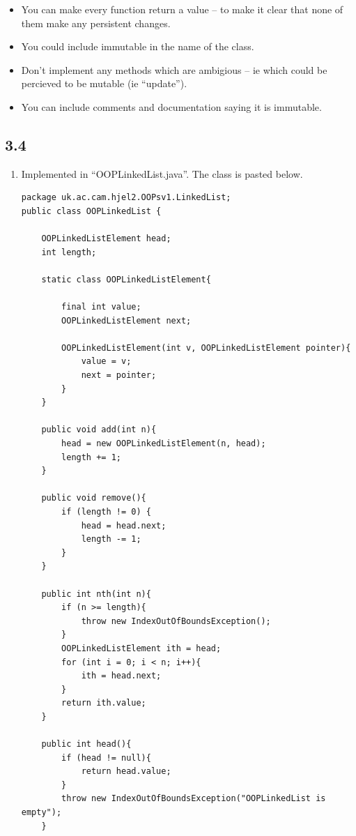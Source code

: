 \documentclass[10pt,\jkfside,a4paper]{article}
\begin{document}
\begin{enumerate}
\begin{enumerate}[label=(\alph*)]
\begin{itemize}
\item You can make every function return a value -- to make it clear that none 
of them make any persistent changes.
\item You could include immutable in the name of the class.
\item Don't implement any methods which are ambigious -- ie which could be percieved 
to be mutable (ie ``update'').
\item You can include comments and documentation saying it is immutable.
\end{itemize}

\end{enumerate}

\subsection*{3.4}
\begin{enumerate}[label=(\alph*)]
\item Implemented in ``OOPLinkedList.java''. The class is pasted below.

\begin{verbatim}
package uk.ac.cam.hjel2.OOPsv1.LinkedList;
public class OOPLinkedList {

    OOPLinkedListElement head;
    int length;

    static class OOPLinkedListElement{

        final int value;
        OOPLinkedListElement next;

        OOPLinkedListElement(int v, OOPLinkedListElement pointer){
            value = v;
            next = pointer;
        }
    }

    public void add(int n){
        head = new OOPLinkedListElement(n, head);
        length += 1;
    }

    public void remove(){
        if (length != 0) {
            head = head.next;
            length -= 1;
        }
    }

    public int nth(int n){
        if (n >= length){
            throw new IndexOutOfBoundsException();
        }
        OOPLinkedListElement ith = head;
        for (int i = 0; i < n; i++){
            ith = head.next;
        }
        return ith.value;
    }

    public int head(){
        if (head != null){
            return head.value;
        }
        throw new IndexOutOfBoundsException("OOPLinkedList is empty");
    }


\end{verbatim}
\end{enumerate}
\end{enumerate}
\end{document}
